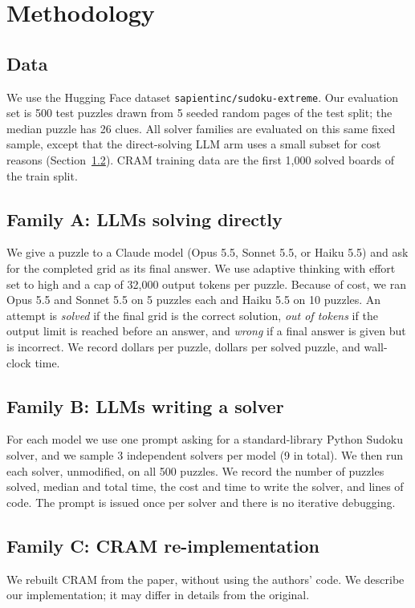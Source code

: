 \documentclass{article} %
\begin{document}
\section{Methodology}
\label{sec:method}
\subsection{Data}
We use the Hugging Face dataset \texttt{sapientinc/sudoku-extreme}. Our evaluation set is 500 test puzzles drawn from 5 seeded random pages of the test split; the median puzzle has 26 clues. All solver families are evaluated on this same fixed sample, except that the direct-solving LLM arm uses a small subset for cost reasons (Section~\ref{sec:direct}). CRAM training data are the first 1,000 solved boards of the train split.

\subsection{Family A: LLMs solving directly}
\label{sec:direct}
We give a puzzle to a Claude model (Opus 5.5, Sonnet 5.5, or Haiku 5.5) and ask for the completed grid as its final answer. We use adaptive thinking with effort set to high and a cap of 32,000 output tokens per puzzle. Because of cost, we ran Opus 5.5 and Sonnet 5.5 on 5 puzzles each and Haiku 5.5 on 10 puzzles. An attempt is \emph{solved} if the final grid is the correct solution, \emph{out of tokens} if the output limit is reached before an answer, and \emph{wrong} if a final answer is given but is incorrect. We record dollars per puzzle, dollars per solved puzzle, and wall-clock time.

\subsection{Family B: LLMs writing a solver}
For each model we use one prompt asking for a standard-library Python Sudoku solver, and we sample 3 independent solvers per model (9 in total). We then run each solver, unmodified, on all 500 puzzles. We record the number of puzzles solved, median and total time, the cost and time to write the solver, and lines of code. The prompt is issued once per solver and there is no iterative debugging.

\subsection{Family C: CRAM re-implementation}
We rebuilt CRAM from the paper, without using the authors' code. We describe our implementation; it may differ in details from the original.
\end{document}
